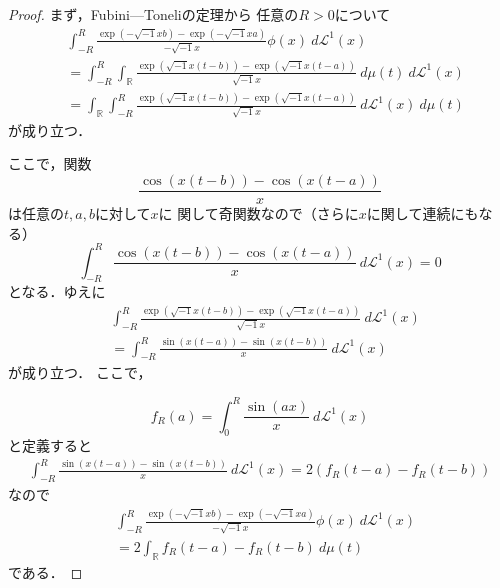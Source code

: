\documentclass[leqno, 12pt]{jsarticle}
\newcommand{\rr}{\mathbb{R}}
\begin{document}
\begin{proof}
まず，Fubini---Toneliの定理から
任意の$R>0$について
\begin{align*}
	&\int_{-R}^{R}
	\frac{\exp(-\sqrt{-1}xb)-\exp(-\sqrt{-1}xa)}{-\sqrt{-1}x}
	\phi(x)\ 
	d\mathcal{L}^1(x)
	\\
	&=
	\int_{-R}^R
	\int_{\rr}
	\frac{\exp(\sqrt{-1}x(t-b))-\exp(\sqrt{-1}x(t-a))}{\sqrt{-1}x}
	\ d\mu(t)\ d\mathcal{L}^1(x)
	\\
	&=
	\int_{\rr}
	\int_{-R}^R
	\frac{\exp(\sqrt{-1}x(t-b))-\exp(\sqrt{-1}x(t-a))}{\sqrt{-1}x}
	\ d\mathcal{L}^1(x)\ d\mu(t)
\end{align*}
が成り立つ．

ここで，関数
\[
\frac{\cos(x(t-b))-\cos(x(t-a))}{x}
\]
は任意の$t, a, b$に対して$x$に
関して奇関数なので（さらに$x$に関して連続にもなる）
\[
\int_{-R}^R\frac{\cos(x(t-b))-\cos(x(t-a))}{x}\ d\mathcal{L}^1(x)=0
\]
となる．ゆえに
\begin{align*}
	&\int_{-R}^R
	\frac{\exp(\sqrt{-1}x(t-b))-\exp(\sqrt{-1}x(t-a))}{\sqrt{-1}x}
	\ d\mathcal{L}^1(x)
	\\
	&=
	\int_{-R}^R
	\frac{\sin(x(t-a))-\sin(x(t-b))}{x}
	\ d\mathcal{L}^1(x)
\end{align*}
が成り立つ．
ここで，

\[
f_R(a)=\int_{0}^{R}\frac{\sin (ax)}{x}\ d\mathcal{L}^1(x)
\]
と定義すると
\begin{align*}
\int_{-R}^R
	\frac{\sin(x(t-a))-\sin(x(t-b))}{x}
	\ d\mathcal{L}^1(x)
	=
	2(f_R(t-a)-f_R(t-b))
\end{align*}
なので
\begin{align*}
&\int_{-R}^{R}
	\frac{\exp(-\sqrt{-1}xb)-\exp(-\sqrt{-1}xa)}{-\sqrt{-1}x}
	\phi(x)\ 
	d\mathcal{L}^1(x)
	\\
	&=
	2\int_{\rr}f_R(t-a)-f_R(t-b)\ d\mu(t)
\end{align*}
である．



\end{proof}
\end{document}
